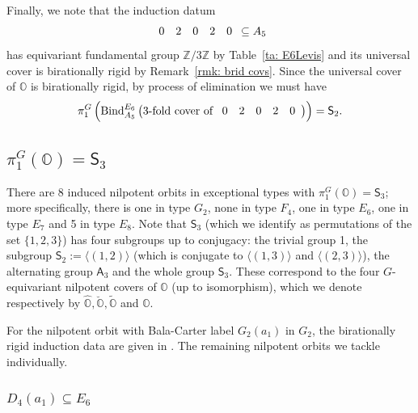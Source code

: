 \documentclass[11pt]{amsart}
\renewcommand{\O}{{\mathbb O}}
\newcommand{\bZ}{{\mathbb Z}}
\newcommand{\Alt}{{\mathsf{A}}}
\newcommand{\Sym}{{\mathsf{S}}}
\newcommand{\BInd}{{{\mbox{\rm Bind}}}}
\newcommand{\covO}{\widetilde{\O}}
\newcommand{\hatO}{\widehat{\O}}
\newcommand{\breveO}{\breve{\O}}
\numberwithin{equation}{section}
\begin{document}
	Finally, we note that the induction datum 
	$$\begin{array}{c c c c c}
		0 & 2 & 0 & 2 & 0
	\end{array}\subseteq A_5
	$$ has equivariant fundamental group $\bZ/3\bZ$ by Table~\ref{ta: E6Levis} and its universal cover is birationally rigid by Remark~\ref{rmk: brid covs}. Since the universal cover of $\O$ is birationally rigid, by process of elimination we must have 
	$$
	\pi_1^G\left(\BInd_{A_5}^{E_6}\left(\mbox{3-fold cover of }\begin{array}{c c c c c}
		0 & 2 & 0 & 2 & 0
	\end{array}\right)\right)=\Sym_2.
	$$
	
	\subsection{\texorpdfstring{$\pi_1^G(\O)=\Sym_3$}{pi=S3}}\label{ss: pi=S3}
	
	There are 8 induced nilpotent orbits in exceptional types with $\pi_1^G(\O)=\Sym_3$; more specifically, there is one in type $G_2$, none in type $F_4$, one in type $E_6$, one in type $E_7$ and 5 in type $E_8$. Note that $\Sym_3$ (which we identify as permutations of the set $\{1,2,3\}$) has four subgroups up to conjugacy: the trivial group 1, the subgroup $\Sym_2:=\langle(1,2)\rangle$ (which is conjugate to $\langle(1,3)\rangle$ and $\langle(2,3)\rangle$), the alternating group $\Alt_3$ and the whole group $\Sym_3$. These correspond to the four $G$-equivariant nilpotent covers of $\O$ (up to isomorphism), which we denote respectively by $\hatO, \breveO, \covO$ and $\O$. 
	
	For the nilpotent orbit with Bala-Carter label $G_2(a_1)$ in $G_2$, the birationally rigid induction data are given in \cite[Example 8.4.1]{LMM}. The remaining nilpotent orbits we tackle individually.
	
	\subsubsection{\texorpdfstring{$D_4(a_1)\subseteq E_6$}{D4a1 in E7}}\label{sss: D4a1 in E6}
	
\end{document}
